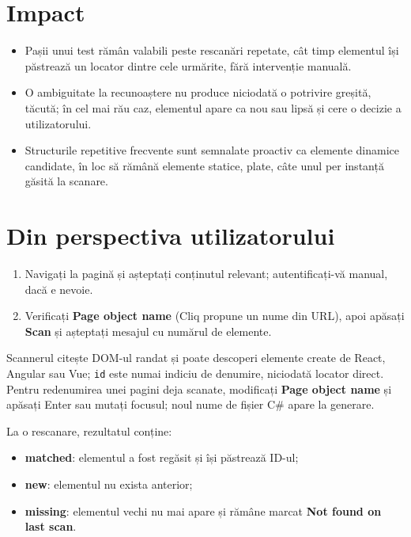 \documentclass[12pt,a4paper]{report}
\newcommand{\UI}[1]{\textbf{#1}}
\newcommand{\File}[1]{\nolinkurl{#1}}
\begin{document}
\section{Impact}

\begin{itemize}
  \item Pașii unui test rămân valabili peste rescanări repetate, cât timp elementul își păstrează un locator dintre cele urmărite, fără intervenție manuală.
  \item O ambiguitate la recunoaștere nu produce niciodată o potrivire greșită, tăcută; în cel mai rău caz, elementul apare ca nou sau lipsă și cere o decizie a utilizatorului.
  \item Structurile repetitive frecvente sunt semnalate proactiv ca elemente dinamice candidate, în loc să rămână elemente statice, plate, câte unul per instanță găsită la scanare.
\end{itemize}

\section{Din perspectiva utilizatorului}

\begin{enumerate}
  \item Navigați la pagină și așteptați conținutul relevant; autentificați-vă manual, dacă e nevoie.
  \item Verificați \UI{Page object name} (Cliq propune un nume din URL), apoi apăsați \UI{Scan} și așteptați mesajul cu numărul de elemente.
\end{enumerate}

Scannerul citește DOM-ul randat și poate descoperi elemente create de React, Angular sau Vue; \File{id} este numai indiciu de denumire, niciodată locator direct. Pentru redenumirea unei pagini deja scanate, modificați \UI{Page object name} și apăsați Enter sau mutați focusul; noul nume de fișier C\# apare la generare.

La o rescanare, rezultatul conține:

\begin{itemize}
  \item \textbf{matched}: elementul a fost regăsit și își păstrează ID-ul;
  \item \textbf{new}: elementul nu exista anterior;
  \item \textbf{missing}: elementul vechi nu mai apare și rămâne marcat \UI{Not found on last scan}.
\end{itemize}
\end{document}
